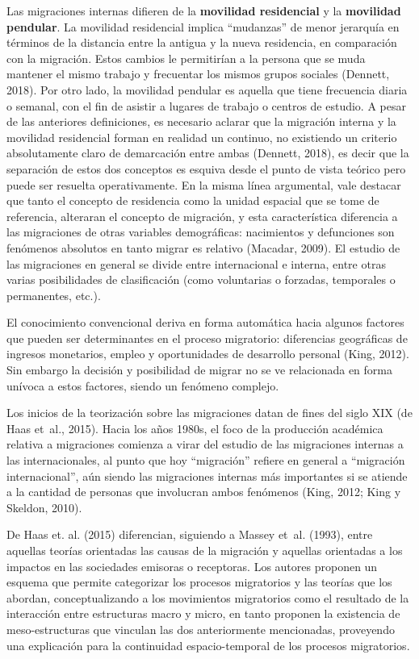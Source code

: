 \documentclass[12pt,spanish,]{article}
\begin{document}
Las migraciones internas difieren de la \textbf{movilidad residencial} y
la \textbf{movilidad pendular}. La movilidad residencial implica
``mudanzas'' de menor jerarquía en términos de la distancia entre la
antigua y la nueva residencia, en comparación con la migración. Estos
cambios le permitirían a la persona que se muda mantener el mismo
trabajo y frecuentar los mismos grupos sociales (Dennett, 2018). Por
otro lado, la movilidad pendular es aquella que tiene frecuencia diaria
o semanal, con el fin de asistir a lugares de trabajo o centros de
estudio. A pesar de las anteriores definiciones, es necesario aclarar
que la migración interna y la movilidad residencial forman en realidad
un continuo, no existiendo un criterio absolutamente claro de
demarcación entre ambas (Dennett, 2018), es decir que la separación de
estos dos conceptos es esquiva desde el punto de vista teórico pero
puede ser resuelta operativamente. En la misma línea argumental, vale
destacar que tanto el concepto de residencia como la unidad espacial que
se tome de referencia, alteraran el concepto de migración, y esta
característica diferencia a las migraciones de otras variables
demográficas: nacimientos y defunciones son fenómenos absolutos en tanto
migrar es relativo (Macadar, 2009). El estudio de las migraciones en
general se divide entre internacional e interna, entre otras varias
posibilidades de clasificación (como voluntarias o forzadas, temporales
o permanentes, etc.).

El conocimiento convencional deriva en forma automática hacia algunos
factores que pueden ser determinantes en el proceso migratorio:
diferencias geográficas de ingresos monetarios, empleo y oportunidades
de desarrollo personal (King, 2012). Sin embargo la decisión y
posibilidad de migrar no se ve relacionada en forma unívoca a estos
factores, siendo un fenómeno complejo.

Los inicios de la teorización sobre las migraciones datan de fines del
siglo XIX (de Haas et~al., 2015). Hacia los años 1980s, el foco de la
producción académica relativa a migraciones comienza a virar del estudio
de las migraciones internas a las internacionales, al punto que hoy
``migración'' refiere en general a ``migración internacional'', aún
siendo las migraciones internas más importantes si se atiende a la
cantidad de personas que involucran ambos fenómenos (King, 2012; King y
Skeldon, 2010).

De Haas et. al. (2015) diferencian, siguiendo a Massey et~al. (1993),
entre aquellas teorías orientadas las causas de la migración y aquellas
orientadas a los impactos en las sociedades emisoras o receptoras. Los
autores proponen un esquema que permite categorizar los procesos
migratorios y las teorías que los abordan, conceptualizando a los
movimientos migratorios como el resultado de la interacción entre
estructuras macro y micro, en tanto proponen la existencia de
meso-estructuras que vinculan las dos anteriormente mencionadas,
proveyendo una explicación para la continuidad espacio-temporal de los
procesos migratorios.
\end{document}
